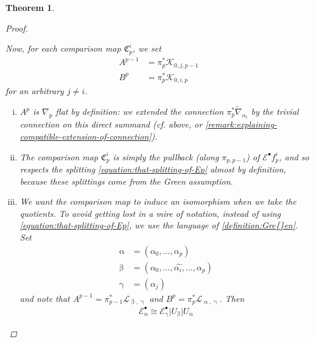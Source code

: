 \documentclass[11pt,fleqn]{article}
\theoremstyle{plain}
\newtheorem{theorem}{Theorem}[subsection]
\theoremstyle{definition}
\theoremstyle{remark}
\numberwithin{equation}{theorem}
\newcommand{\restricted}{\mathbin{\big\vert}}
\newcommand{\comparison}[1]{\mathfrak{C}_{#1}}
\begin{document}
\begin{theorem}
\begin{proof}
\begin{enumerate}
                        Now, for each comparison map $\comparison{p}^i$, we set
                        \begin{align*}
                            A^{p-1} &= \pi_p^*\mathcal{K}_{0,j,p-1}\\
                            B^p &= \pi_p^*\mathcal{K}_{0,i,p}
                        \end{align*}
                        for an arbitrary $j\neq i$.
                        \begin{enumerate}[(i)]
                            \item $A^p$ is $\nabla_p$ flat by definition: we extended the connection $\pi_p^*\widetilde{\nabla}_{\alpha_i}$ by the trivial connection on this direct summand (cf. above, or \cref{remark:explaining-compatible-extension-of-connection}).
                            \item The comparison map $\comparison{p}^i$ is simply the pullback (along $\pi_{p,p-1}$) of $\mathcal{E}^\bullet f_p^i$, and so respects the splitting \cref{equation:that-splitting-of-Ep} almost by definition, because these splittings come from the Gre{}en assumption.
                            \item We want the comparison map to induce an isomorphism when we take the quotients.
                                To avoid getting lost in a mire of notation, instead of using \cref{equation:that-splitting-of-Ep}, we use the language of \cref{definition:Gre{}en}.
                                Set
                                \begin{align*}
                                    \upalpha &= (\alpha_0,\ldots,\alpha_p)\\
                                    \upbeta &= (\alpha_0,\ldots,\widehat{\alpha_i},\ldots,\alpha_p)\\
                                    \upgamma &= (\alpha_j)
                                \end{align*}
                                and note that $A^{p-1}=\pi_{p-1}^* \mathcal{L}_{\upbeta,\upgamma}$ and $B^p=\pi_p^* \mathcal{L}_{\upalpha,\upgamma}$.
                                Then
                                \begin{equation*}
                                    \begin{array}{lr}
                                        \mathcal{E}_\upalpha^\bullet
                                        \cong
                                        \mathcal{E}_\upgamma^\bullet \restricted U_\upbeta \restricted U_\upalpha

\end{array}
\end{equation*}
\end{enumerate}
\end{enumerate}
\end{proof}
\end{theorem}
\end{document}
